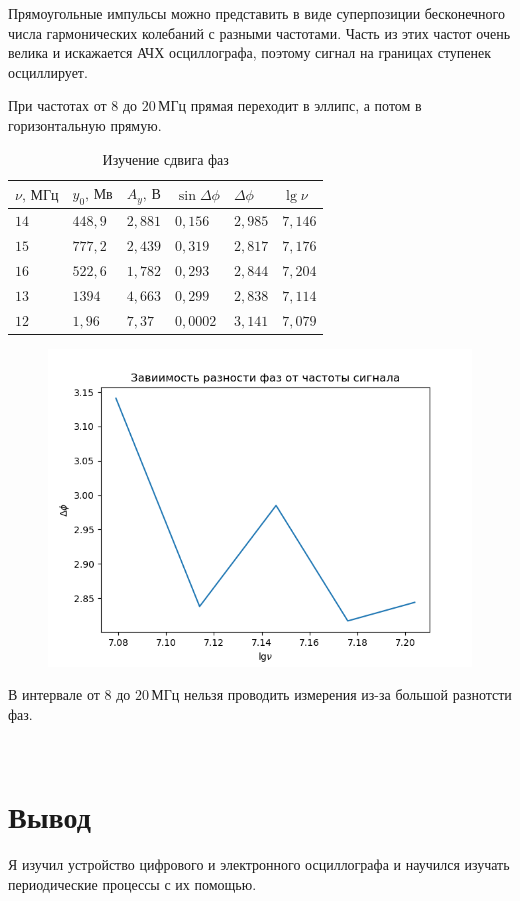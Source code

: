 Прямоугольные импульсы можно представить в виде суперпозиции бесконечного числа
гармонических колебаний с разными частотами. Часть из этих частот очень велика и
искажается АЧХ осциллографа, поэтому сигнал на границах ступенек осциллирует.

При частотах от $8$ до $20\,\text{МГц}$ прямая переходит в эллипс, а потом
в горизонтальную прямую. 

\begin{table}[ht!]
    \caption{Изучение сдвига фаз}
    \begin{tabular}{|l|l|l|l|l|l|}
    \hline
    $\nu,\,\text{МГц}$ & $y_0,\,\text{Мв}$ & $A_y,\,\text{В}$ & $\sin\Delta\phi$ & $\Delta\phi$ & $\lg\nu$  \\ \hline
    $14$              & $448{,}9$         & $2{,}881$        & $0{,}156$        & $2{,}985$    & $7{,}146$ \\ \hline
    $15$              & $777{,}2$         & $2{,}439$        & $0{,}319$        & $2{,}817$    & $7{,}176$ \\ \hline
    $16$              & $522{,}6$         & $1{,}782$        & $0{,}293$        & $2{,}844$    & $7{,}204$ \\ \hline
    $13$              & $1394$            & $4{,}663$        & $0{,}299$        & $2{,}838$    & $7{,}114$ \\ \hline
    $12$              & $1{,}96$          & $7{,}37$         & $0{,}0002$       & $3{,}141$    & $7{,}079$ \\ \hline
    \end{tabular}
\end{table}
\begin{figure}[ht!]\centering\includegraphics[width=0.8\linewidth]{img/kek}\end{figure}

В интервале от $8$ до $20\,\text{МГц}$ нельзя проводить измерения из-за большой
разнотсти фаз.

\newpage
~
\newpage
~
\newpage
~
\newpage
~
\newpage
~
\newpage
~

\section{Вывод}

Я изучил устройство цифрового и электронного осциллографа и научился изучать периодические
процессы с их помощью.
